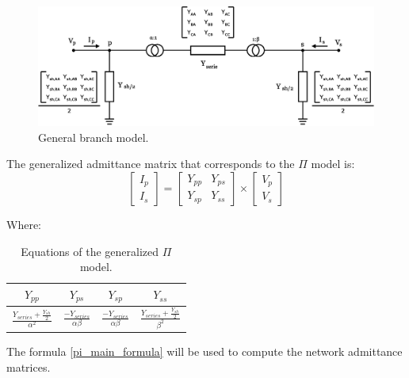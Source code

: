 \documentclass{tufte-book}
\begin{document}
\begin{center}
	\begin{figure}[h]
		\includegraphics[width=0.6\linewidth]{img/Branch.eps}
		\caption{General branch model.}
		\label{pi_model}
	\end{figure}
\end{center}

The generalized admittance matrix that corresponds to the $\Pi$ model is:
\begin{equation}
\left[\begin{array}{c}
I_p \\
I_s
\end{array}\right] = \left[\begin{array}{cc}
Y_{pp} & Y_{ps} \\
Y_{sp} & Y_{ss}
\end{array}\right] \times \left[\begin{array}{c}
V_p \\
V_s
\end{array}\right]
\label{pi_main_formula}
\end{equation}

Where:

\begin{table}[h!]
\begin{center}
\begin{tabular}{cccc}
\toprule

$Y_{pp}$ &  $Y_{ps}$ & $Y_{sp}$ & $Y_{ss}$\\

\midrule

$\frac{Y_{series} + \frac{Y_{sh}}{2}}{\alpha^2}$ &  $\frac{-Y_{series}}{\alpha\beta}$ & $\frac{-Y_{series}}{\alpha\beta}$ & $\frac{Y_{series} + \frac{Y_{sh}}{2}}{\beta^2}$\\

\bottomrule
\end{tabular}
\end{center}
  \caption{Equations of the generalized $\Pi$ model.}
  \label{pi_model_equations}
\end{table}

The formula \ref{pi_main_formula} will be used to compute the network admittance matrices.
\end{document}
